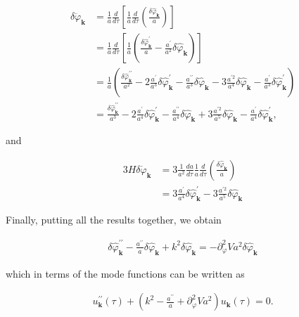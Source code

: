 \begin{align}
    \delta \ddot{\varphi}_{\mathbf{k}} & =\frac{1}{a} \frac{d}{d \tau}\left[\frac{1}{a} \frac{d}{d \tau}\left(\frac{\delta \hat{\varphi}_{\mathbf{k}}}{a}\right)\right] \\
    & =\frac{1}{a} \frac{d}{d \tau}\left[\frac{1}{a}\left(\frac{\delta \hat{\varphi}_{\mathbf{k}}^{\prime}}{a}-\frac{a^{\prime}}{a^{2}} \delta \hat{\varphi}_{\mathbf{k}}\right)\right] \\
    & =\frac{1}{a}\left(\frac{\delta \hat{\varphi}_{\mathbf{k}}^{\prime \prime}}{a^{2}}-2 \frac{a^{\prime}}{a^{3}} \delta \hat{\varphi}_{\mathbf{k}}^{\prime}-\frac{a^{\prime \prime}}{a^{3}} \delta \hat{\varphi}_{\mathbf{k}}-3 \frac{a^{\prime 2}}{a^{4}} \delta \hat{\varphi}_{\mathbf{k}}-\frac{a^{\prime}}{a^{3}} \delta \hat{\varphi}_{\mathbf{k}}^{\prime}\right) \\
    & =\frac{\delta \hat{\varphi}_{\mathbf{k}}^{\prime \prime}}{a^{3}}-2 \frac{a^{\prime}}{a^{4}} \delta \hat{\varphi}_{\mathbf{k}}^{\prime}-\frac{a^{\prime \prime}}{a^{4}} \delta \hat{\varphi}_{\mathbf{k}}+3 \frac{a^{\prime 2}}{a^{5}} \delta \hat{\varphi}_{\mathbf{k}}-\frac{a^{\prime}}{a^{4}} \delta \hat{\varphi}_{\mathbf{k}}^{\prime},
\end{align}


and


\begin{align}
    3 H \delta \dot{\varphi}_{\mathbf{k}} & =3 \frac{1}{a^{2}} \frac{d a}{d \tau} \frac{1}{a} \frac{d}{d \tau}\left(\frac{\delta \hat{\varphi}_{\mathbf{k}}}{a}\right) \\
    & =3 \frac{a^{\prime}}{a^{4}} \delta \hat{\varphi}_{\mathbf{k}}^{\prime}-3 \frac{a^{\prime 2}}{a^{5}} \delta \hat{\varphi}_{\mathbf{k}}
\end{align}


Finally, putting all the results together, we obtain

\begin{align}
    \delta \hat{\varphi}_{\mathbf{k}}^{\prime \prime}-\frac{a^{\prime \prime}}{a} \delta \hat{\varphi}_{\mathbf{k}}+k^{2} \delta \hat{\varphi}_{\mathbf{k}}=-\partial_{\varphi}^{2} V a^{2} \delta \hat{\varphi}_{\mathbf{k}} \label{2.74}
\end{align}

which in terms of the mode functions can be written as

\begin{align}
    u_{\mathbf{k}}^{\prime \prime}(\tau)+\left(k^{2}-\frac{a^{\prime \prime}}{a}+\partial_{\varphi}^{2} V a^{2}\right) u_{\mathbf{k}}(\tau)=0 . \label{2.75}
\end{align}

